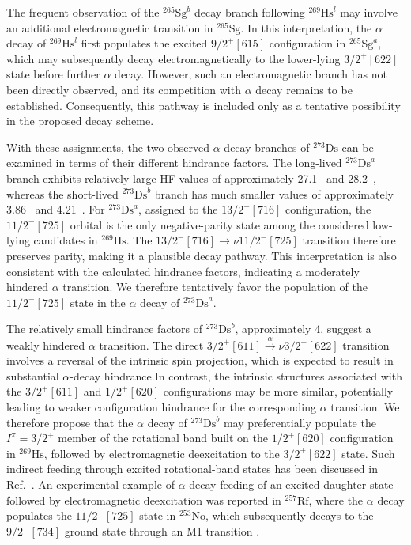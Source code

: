 \documentclass[final,5p,times,twocolumn,number,sort&compress]{elsarticle}
\begin{document}
The frequent observation of the $^{265}\mathrm{Sg}^{b}$ decay branch following $^{269}\mathrm{Hs}^{l}$ may involve an additional electromagnetic transition in $^{265}\mathrm{Sg}$. In this interpretation, the $\alpha$ decay of $^{269}\mathrm{Hs}^{l}$ first populates the excited $9/2^+[615]$ configuration in $^{265}\mathrm{Sg}^{a}$, which may subsequently decay electromagnetically to the lower-lying $3/2^+[622]$ state before further $\alpha$ decay. However, such an electromagnetic branch has not been directly observed, and its competition with $\alpha$ decay remains to be established. Consequently, this pathway is included only as a tentative possibility in the proposed decay scheme.

With these assignments, the two observed $\alpha$-decay branches of $^{273}\mathrm{Ds}$ can be examined in terms of their different hindrance factors. The long-lived $^{273}\mathrm{Ds}^{a}$ branch exhibits relatively large HF values of approximately 27.1~\cite{Poenaru1980,Rurarz1983} and 28.2~\cite{oganessianMeasurementsCrossSections2004}, whereas the short-lived $^{273}\mathrm{Ds}^{b}$ branch has much smaller values of approximately 3.86~\cite{Poenaru1980,Rurarz1983} and 4.21~\cite{oganessianMeasurementsCrossSections2004}. For $^{273}\mathrm{Ds}^{a}$, assigned to the $13/2^-[716]$ configuration, the $11/2^-[725]$ orbital is the only negative-parity state among the considered low-lying candidates in $^{269}\mathrm{Hs}$. The $13/2^-[716]\rightarrow\nu11/2^-[725]$ transition therefore preserves parity, making it a plausible decay pathway. This interpretation is also consistent with the calculated hindrance factors, indicating a moderately hindered $\alpha$ transition. We therefore tentatively favor the population of the $11/2^-[725]$ state in the $\alpha$ decay of $^{273}\mathrm{Ds}^{a}$.

The relatively small hindrance factors of $^{273}\mathrm{Ds}^{b}$, approximately 4, suggest a weakly hindered $\alpha$ transition. The direct $3/2^+[611]\xrightarrow{\alpha}\nu3/2^+[622]$ transition involves a reversal of the intrinsic spin projection, which is expected to result in substantial $\alpha$-decay hindrance.In contrast, the intrinsic structures associated with the $3/2^+[611]$ and $1/2^+[620]$ configurations may be more similar, potentially leading to weaker configuration hindrance for the corresponding $\alpha$ transition. We therefore propose that the $\alpha$ decay of $^{273}\mathrm{Ds}^{b}$ may preferentially populate the $I^\pi=3/2^+$ member of the rotational band built on the $1/2^+[620]$ configuration in $^{269}\mathrm{Hs}$, followed by electromagnetic deexcitation to the $3/2^+[622]$ state. Such indirect feeding through excited rotational-band states has been discussed in Ref.~\cite{ackermann2024IsomersSuperheavyNuclei}. An experimental example of $\alpha$-decay feeding of an excited daughter state followed by electromagnetic deexcitation was reported in $^{257}\mathrm{Rf}$, where the $\alpha$ decay populates the $11/2^-[725]$ state in $^{253}\mathrm{No}$, which subsequently decays to the $9/2^-[734]$ ground state through an M1 transition \cite{Hauschild2022}. 
\end{document}
